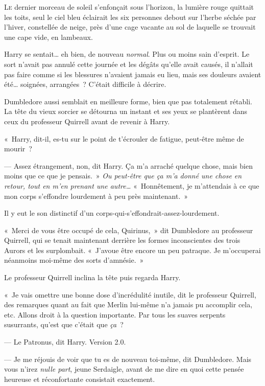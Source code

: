 
\lettrine{L}{e} dernier morceau de soleil s'enfonçait sous l'horizon, la lumière rouge quittait les toits, seul le ciel bleu éclairait les six personnes debout sur l'herbe séchée par l'hiver, constellée de neige, près d'une cage vacante au sol de laquelle se trouvait une cape vide, en lambeaux.

Harry se sentait… eh bien, de nouveau \emph{normal}.
Plus ou moins sain d'esprit.
Le sort n'avait pas annulé cette journée et les dégâts qu'elle avait causés, il n'allait pas faire comme si les blessures n'avaient jamais eu lieu, mais ses douleurs avaient été… soignées, arrangées~?
C'était difficile à décrire.

Dumbledore aussi semblait en meilleure forme, bien que pas totalement rétabli.
La tête du vieux sorcier se détourna un instant et ses yeux se plantèrent dans ceux du professeur Quirrell avant de revenir à Harry.

«~Harry, dit-il, es-tu sur le point de t'écrouler de fatigue, peut-être même de mourir~?

--- Assez étrangement, non, dit Harry.
Ça m'a arraché quelque chose, mais bien moins que ce que je pensais.~»
\emph{Ou peut-être que ça m'a donné une chose en retour, tout en m'en prenant une autre…} «~Honnêtement, je m'attendais à ce que mon corps s'effondre lourdement à peu près maintenant.~»

Il y eut le son distinctif d'un corps-qui-s'effondrait-assez-lourdement.

«~Merci de vous être occupé de cela, Quirinus,~» dit Dumbledore au professeur Quirrell, qui se tenait maintenant derrière les formes inconscientes des trois Aurors et les surplombait.
«~J'avoue être encore un peu patraque.
Je m'occuperai néanmoins moi-même des sorts d'amnésie.~»

Le professeur Quirrell inclina la tête puis regarda Harry.

«~Je vais omettre une bonne dose d'incrédulité inutile, dit le professeur Quirrell, des remarques quant au fait que Merlin lui-même n'a jamais pu accomplir cela, etc.
Allons droit à la question importante.
Par tous les suaves serpents susurrants, qu'est que c'était que \emph{ça}~?

--- Le Patronus, dit Harry.
Version 2.0.

--- Je me réjouis de voir que tu es de nouveau toi-même, dit Dumbledore.
Mais vous n'irez \emph{nulle part}, jeune Serdaigle, avant de me dire en quoi cette pensée heureuse et réconfortante consistait exactement.

